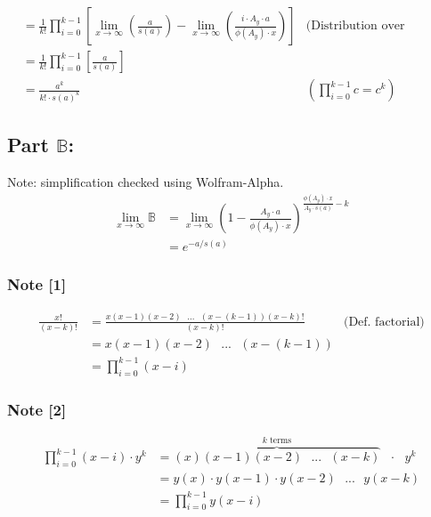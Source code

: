 \documentclass{article}
\theoremstyle{definition}
\begin{document}
\begin{align*}
                                  & = \frac{1}{k!} \prod_{i = 0}^{k-1} \left[  \lim_{x \to \infty} \left(   \frac{a}{ s(a)}\right) -  \lim_{x \to \infty}\left(\frac{i \cdot A_y \cdot a }{\phi(A_y) \cdot x} \right) \right]                         & \text{(Distribution over difference limit law)} \\
                                  & = \frac{1}{k!} \prod_{i = 0}^{k-1} \left[     \frac{a}{ s(a)} \right]\\
                                  & =\frac{a^k}{k! \cdot s(a)^k}                                                                                                                                                                                      & \left( \prod_{i = 0}^{k-1}c = c^k \right)
\end{align*}

\subsection*{Part $\mathbb{B}$:}
Note: simplification checked using Wolfram-Alpha.
\begin{align*}
    \lim_{x \to \infty} \mathbb{B} & = \lim_{x \to \infty}\left(1- \frac{A_y \cdot a}{\phi(A_y) \cdot x}\right)^{\frac{\phi(A_y) \cdot x}{A_y \cdot s(a)  } -k} \\
                                   & = e^{-a/s(a)}
\end{align*}

\subsubsection*{Note [1]}
\begin{align*}
    \frac{x!}{(x-k)!} & = \frac{x(x-1)(x-2) \text{ } ...\text{ } (x-(k-1))(x-k)!  }{(x-k)!} & \text{(Def. factorial)} \\
                      & = x(x-1)(x-2) \text{ } ...\text{ } (x-(k-1))                                                  \\
                      & = \prod_{i = 0}^{k-1}(x-i)
\end{align*}
\subsubsection*{Note [2]}\begin{align*}
    \prod_{i=0}^{k-1}(x-i) \cdot y^k & = \overbrace {(x)(x-1)(x-2) \text{ } ... \text{ } (x-k)}^{k \text{ terms}} \text{ } \cdot \text{ }y^k \\
                                     & = y(x) \cdot  y(x-1) \cdot y(x-2) \text{ } ... \text{ } y(x-k)                                        \\
                                     & = \prod_{i=0}^{k-1} y(x-i)
\end{align*}



\end{document}
